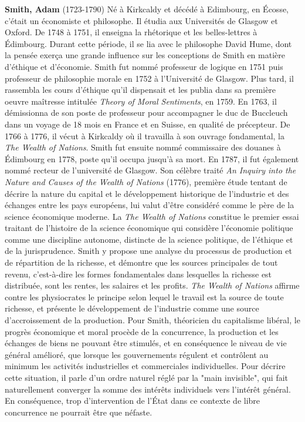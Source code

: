 \textbf{Smith, Adam} (1723-1790) Né à Kirkcaldy et décédé à Edimbourg, en Écosse, c'était un économiste et philosophe. Il étudia aux Universités de Glasgow et Oxford. De 1748 à 1751, il enseigna la rhétorique et les belles-lettres à Édimbourg. Durant cette période, il se lia avec le philosophe David Hume, dont la pensée exerça une grande influence sur les conceptions de Smith en matière d'éthique et d'économie. Smith fut nommé professeur de logique en 1751 puis professeur de philosophie morale en 1752 à l'Université de Glasgow. Plus tard, il rassembla les cours d'éthique qu'il dispensait et les publia dans sa première oeuvre maîtresse intitulée \textit{Theory of Moral Sentiments}, en 1759. En 1763, il démissionna de son poste de professeur pour accompagner le duc de Buccleuch dans un voyage de 18 mois en France et en Suisse, en qualité de précepteur. De 1766 à 1776, il vécut à Kirkcaldy où il travailla à son ouvrage fondamental, la \textit{The Wealth of Nations}. Smith fut ensuite nommé commissaire des douanes à Édimbourg en 1778, poste qu'il occupa jusqu'à sa mort. En 1787, il fut également nommé recteur de l'université de Glasgow. Son célèbre traité \textit{An Inquiry into the Nature and Causes of the Wealth of Nations} (1776), première étude tentant de décrire la nature du capital et le développement historique de l'industrie et des échanges entre les pays européens, lui valut d'être considéré comme le père de la science économique moderne. La \textit{The Wealth of Nations} constitue le premier essai traitant de l'histoire de la science économique qui considère l'économie politique comme une discipline autonome, distincte de la science politique, de l'éthique et de la jurisprudence. Smith y propose une analyse du processus de production et de répartition de la richesse, et démontre que les sources principales de tout revenu, c'est-à-dire les formes fondamentales dans lesquelles la richesse est distribuée, sont les rentes, les salaires et les profits. \textit{The Wealth of Nations} affirme contre les physiocrates le principe selon lequel le travail est la source de toute richesse, et présente le développement de l'industrie comme une source d'accroissement de la production. Pour Smith, théoricien du capitalisme libéral, le progrès économique et moral procède de la concurrence, la production et les échanges de biens ne pouvant être stimulés, et en conséquence le niveau de vie général amélioré, que lorsque les gouvernements régulent et contrôlent au minimum les activités industrielles et commerciales individuelles. Pour décrire cette situation, il parle d'un ordre naturel réglé par la "main invisible", qui fait naturellement converger la somme des intérêts individuels vers l'intérêt général. En conséquence, trop d'intervention de l'État dans ce contexte de libre concurrence ne pourrait être que néfaste.

